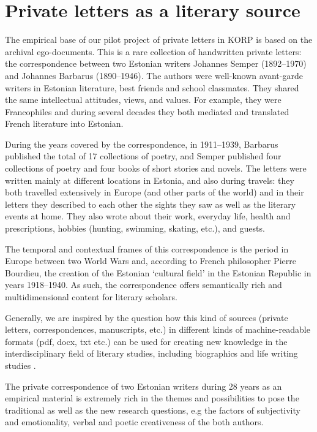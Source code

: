 \documentclass[runningheads]{llncs}
\begin{document}
\section{Private letters as a literary source}

The empirical base of our pilot project of private letters in KORP is based on the archival ego-documents. This is a rare collection of handwritten private letters: the correspondence between two Estonian writers Johannes Semper (1892--1970) and Johannes Barbarus (1890--1946). The authors were well-known avant-garde writers in Estonian literature, best friends and school classmates. They shared the same intellectual attitudes, views, and values. For example, they were Francophiles and during several decades they both mediated and translated French literature into Estonian. 

During the years covered by the correspondence, in 1911--1939, Barbarus published the total of 17 collections of poetry, and Semper published four collections of poetry and four books of short stories and novels. The letters were written mainly at different locations in Estonia, and also during travels: they both travelled extensively in Europe (and other parts of the world) and in their letters they described to each other the sights they saw as well as the literary events at home. They also wrote about their work, everyday life, health and prescriptions, hobbies (hunting, swimming, skating, etc.), and guests. 

The temporal and contextual frames of this correspondence is the period in Europe between two World Wars and, according to French philosopher Pierre Bourdieu, the creation of  the Estonian ‘cultural field’ in the Estonian Republic in years 1918--1940. As such, the correspondence offers semantically rich and multidimensional content for literary scholars.  

Generally, we are inspired by the question how this kind of sources (private letters, correspondences, manuscripts, etc.) in different kinds of machine-readable formats (pdf, docx, txt etc.) can be used for creating new knowledge in the interdisciplinary field of literary studies, including biographics and life writing studies \cite{2015}. 

The private correspondence of two Estonian writers during 28 years as an empirical material is extremely rich in the themes and possibilities to pose the traditional as well as the new research questions, e.g the factors of subjectivity and emotionality, verbal and poetic creativeness of the both authors.  
\end{document}
